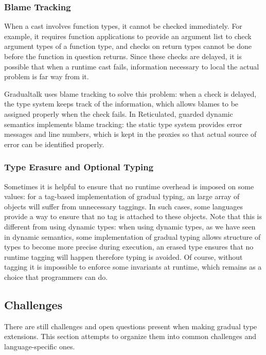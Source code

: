 \subsubsection{Blame Tracking}

When a cast involves function types, it cannot be checked immediately\cite{findler2002contracts,siek2009exploring}.
For example, it requires function applications to provide an argument list to check argument types
of a function type, and checks on return types cannot be done before the function in question
returns. Since these checks are delayed, it is possible that when a runtime cast fails,
information necessary to local the actual problem is far way from it.

Gradualtalk uses blame tracking\cite{wadler2009well} to solve this problem:
when a check is delayed, the type system keeps track of the information,
which allows blames to be assigned properly when the check fails.
In Reticulated, guarded dynamic semantics implements blame tracking:
the static type system provides error messages and line numbers,
which is kept in the proxies so that actual source of error can be identified properly.

\subsubsection{Type Erasure and Optional Typing}

Sometimes it is helpful to ensure that no runtime overhead is imposed
on some values: for a tag-based implementation of gradual typing,
an large array of objects will suffer from unnecessary taggings.
In such cases, some languages provide a way to ensure that no tag is attached
to these objects.
Note that this is different from using dynamic types:
when using dynamic types, as we have seen in dynamic semantics,
some implementation of gradual typing allows structure of types to become more precise
during execution, an erased type ensures that no runtime tagging will happen
therefore typing is avoided.
Of course, without tagging it is impossible to enforce some invariants at runtime,
which remains as a choice that programmers can do.

\subsection{Challenges}

There are still challenges and open questions present when
making gradual type extensions. This section attempts to
organize them into common challenges and language-specific ones.

